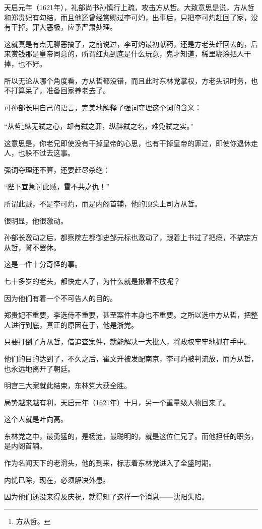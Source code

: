 \begin{multicols}{\theparacolNo}
天启元年（1621年），礼部尚书孙慎行上疏，攻击方从哲。大致意思是说，方从哲和郑贵妃有勾结，而且他还曾经赏赐过李可灼，出事后，只把李可灼赶回了家，没有干掉，罪大恶极，应予严肃处理。

这就真是有点无聊恶搞了，之前说过，李可灼最初献药，还是方老头赶回去的，后来赏钱那是皇帝同意的，所谓红丸到底是什么玩意，鬼才知道，稀里糊涂把人干掉，也不好。

所以无论从哪个角度看，方从哲都没错，而且此时东林党掌权，方老头识时务，也不打算呆了，准备回家养老去了。

可孙部长用自己的语言，完美地解释了强词夺理这个词的含义：

“从哲\footnote{方从哲。}纵无弑之心，却有弑之罪，纵辞弑之名，难免弑之实。”

这意思是，你老兄即使没有干掉皇帝的心思，也有干掉皇帝的罪过，即使你退休走人，也躲不过去这事。

强词夺理还不算，还要赶尽杀绝：

“陛下宜急讨此贼，雪不共之仇！”

所谓此贼，不是李可灼，而是内阁首辅，他的顶头上司方从哲。

很明显，他很激动。

孙部长激动之后，都察院左都御史邹元标也激动了，跟着上书过了把瘾，不搞定方从哲，誓不罢休。

这是一件十分奇怪的事。

七十多岁的老头，都快走人了，为什么就是揪着不放呢？

因为他们有着一个不可告人的目的。

郑贵妃不重要，李选侍不重要，甚至案件本身也不重要。之所以选中方从哲，把整人进行到底，真正的原因在于，他是浙党。

只要打倒了方从哲，借追查案件，就能解决一大批人，将政权牢牢地抓在手中。

他们的目的达到了，不久之后，崔文升被发配南京，李可灼被判流放，而方从哲，也永远地离开了朝廷。

明宫三大案就此结束，东林党大获全胜。

局势越来越有利，天启元年（1621年）十月，另一个重量级人物回来了。

这个人就是叶向高。

东林党之中，最勇猛的，是杨涟，最聪明的，就是这位仁兄了。而他担任的职务，是内阁首辅。

作为名闻天下的老滑头，他的到来，标志着东林党进入了全盛时期。

内忧已除，现在，必须解决外患。

因为他们还没来得及庆祝，就得知了这样一个消息——沈阳失陷。


\end{multicols}
